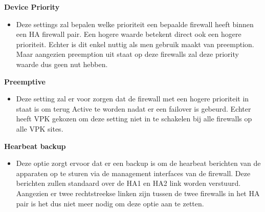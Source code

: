 \textbf{Device Priority}
    \begin{itemize}[label=\textbullet]
        \item Deze settings zal bepalen welke prioriteit een bepaalde firewall heeft binnen een HA firewall pair. Een hogere waarde betekent direct ook een hogere prioriteit. Echter is dit enkel nuttig als men gebruik maakt van preemption. Maar aangezien preemption uit staat op deze firewalls zal deze priority waarde dus geen nut hebben.
    \end{itemize}



\textbf{Preemptive}
    \begin{itemize}[label=\textbullet]
        \item Deze setting zal er voor zorgen dat de firewall met een hogere prioriteit in staat is om terug Active te worden nadat er een failover is gebeurd. Echter heeft VPK gekozen om deze setting niet in te schakelen bij alle firewalls op alle VPK sites.
    \end{itemize}



\textbf{Hearbeat backup}
    \begin{itemize}[label=\textbullet]
        \item Deze optie zorgt ervoor dat er een backup is om de hearbeat berichten van de apparaten op te sturen via de management interfaces van de firewall. Deze berichten zullen standaard over de HA1 en HA2 link worden verstuurd. Aangezien er twee rechtstreekse linken zijn tussen de twee firewalls in het HA pair is het dus niet meer nodig om deze optie aan te zetten.
    \end{itemize}


